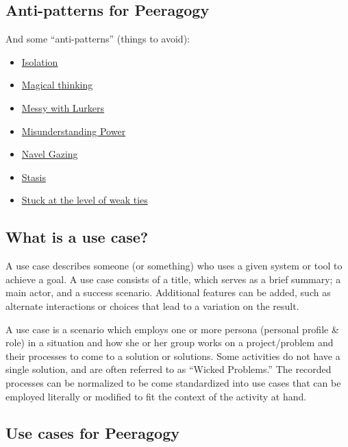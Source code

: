 \subsection{Anti-patterns for Peeragogy}

And some ``anti-patterns'' (things to avoid):

\begin{itemize}
\item
  \href{http://peeragogy.org/antipatterns/isolation/}{Isolation}
\item
  \href{http://peeragogy.org/antipatterns/magical-thinking/}{Magical
  thinking}
\item
  \href{http://peeragogy.org/antipatterns/co-learning-messy-with-lurkers/}{Messy
  with Lurkers}
\item
  \href{http://peeragogy.org/antipatterns/misunderstanding-power/}{Misunderstanding
  Power}
\item
  \href{http://peeragogy.org/antipatterns/navel-gazing/}{Navel Gazing}
\item
  \href{http://peeragogy.org/antipatterns/stasis/}{Stasis}
\item
  \href{http://peeragogy.org/antipatterns/stuck-at-the-level-of-weak-ties/}{Stuck
  at the level of weak ties}
\end{itemize}
\subsection{What is a use case?}

A use case describes someone (or something) who uses a given system or
tool to achieve a goal. A use case consists of a title, which serves as
a brief summary; a main actor, and a success scenario. Additional
features can be added, such as alternate interactions or choices that
lead to a variation on the result.

A use case is a scenario which employs one or more persona (personal
profile \& role) in a situation and how she or her group works on a
project/problem and their processes to come to a solution or solutions.
Some activities do not have a single solution, and are often referred to
as ``Wicked Problems.'' The recorded processes can be normalized to be
come standardized into use cases that can be employed literally or
modified to fit the context of the activity at hand.

\subsection{Use cases for Peeragogy}

